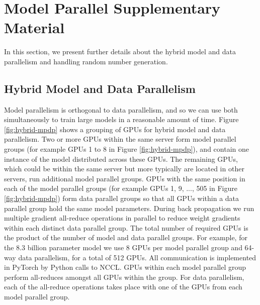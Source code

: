 \section{Model Parallel Supplementary Material }
\label{sec:modelpar:supp}

In this section, we present further details about the hybrid model and data parallelism and handling random number generation.


\subsection{Hybrid Model and Data Parallelism}
Model parallelism is orthogonal to data parallelism, and so we can use both simultaneously to train large models in a reasonable amount of time. Figure \ref{fig:hybrid-mpdp} shows a grouping of GPUs for hybrid model and data parallelism. Two or more GPUs within the same server form model parallel groups (for example GPUs 1 to 8 in Figure \ref{fig:hybrid-mpdp}), and contain one instance of the model distributed across these GPUs.  The remaining GPUs, which could be within the same server but more typically are located in other servers, run additional model parallel groups. GPUs with the same position in each of the model parallel groups (for example GPUs 1, 9, ..., 505 in Figure \ref{fig:hybrid-mpdp}) form data parallel groups so that all GPUs within a data parallel group hold the same model parameters. During back propagation we run multiple gradient all-reduce operations in parallel to reduce weight gradients within each distinct data parallel group. The total number of required GPUs is the product of the number of model and data parallel groups. For example, for the 8.3 billion parameter model we use 8 GPUs per model parallel group and 64-way data parallelism, for a total of 512 GPUs.  All communication is implemented in PyTorch by Python calls to NCCL.  GPUs within each model parallel group perform all-reduces amongst all GPUs within the group.  For data parallelism, each of the all-reduce operations takes place with one of the GPUs from each model parallel group.


